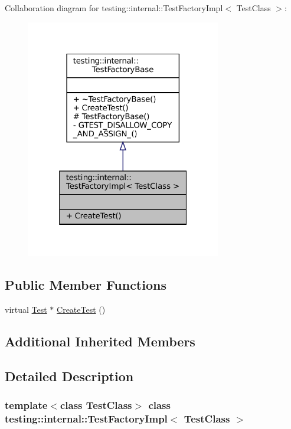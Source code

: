 Collaboration diagram for testing\+:\+:internal\+:\+:Test\+Factory\+Impl$<$ Test\+Class $>$\+:
\nopagebreak
\begin{figure}[H]
\begin{center}
\leavevmode
\includegraphics[width=241pt]{classtesting_1_1internal_1_1TestFactoryImpl__coll__graph}
\end{center}
\end{figure}
\subsection*{Public Member Functions}
\begin{DoxyCompactItemize}
\item 
virtual \hyperlink{classtesting_1_1Test}{Test} $\ast$ \hyperlink{classtesting_1_1internal_1_1TestFactoryImpl_a8860c89bdb06450a5d5e8137ebd9d775}{Create\+Test} ()
\end{DoxyCompactItemize}
\subsection*{Additional Inherited Members}


\subsection{Detailed Description}
\subsubsection*{template$<$class Test\+Class$>$\newline
class testing\+::internal\+::\+Test\+Factory\+Impl$<$ Test\+Class $>$}



